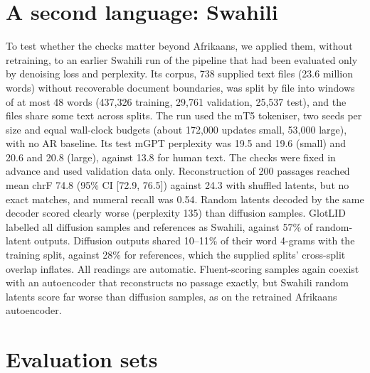 \documentclass[11pt,a4paper]{article}
\begin{document}
\section{A second language: Swahili}
\label{app:swahili}
To test whether the checks matter beyond Afrikaans, we applied them, without retraining, to an earlier Swahili run of the pipeline that had been evaluated only by denoising loss and perplexity. Its corpus, 738 supplied text files (23.6 million words) without recoverable document boundaries, was split by file into windows of at most 48 words (437,326 training, 29,761 validation, 25,537 test), and the files share some text across splits. The run used the mT5 tokeniser, two seeds per size and equal wall-clock budgets (about 172,000 updates small, 53,000 large), with no AR baseline. Its test mGPT perplexity was 19.5 and 19.6 (small) and 20.6 and 20.8 (large), against 13.8 for human text. The checks were fixed in advance and used validation data only. Reconstruction of 200 passages reached mean chrF 74.8 (95\% CI [72.9, 76.5]) against 24.3 with shuffled latents, but no exact matches, and numeral recall was 0.54. Random latents decoded by the same decoder scored clearly worse (perplexity 135) than diffusion samples. GlotLID labelled all diffusion samples and references as Swahili, against 57\% of random-latent outputs. Diffusion outputs shared 10--11\% of their word 4-grams with the training split, against 28\% for references, which the supplied splits' cross-split overlap inflates. All readings are automatic. Fluent-scoring samples again coexist with an autoencoder that reconstructs no passage exactly, but Swahili random latents score far worse than diffusion samples, as on the retrained Afrikaans autoencoder.

\section{Evaluation sets}
\label{app:ledger}
\end{document}

